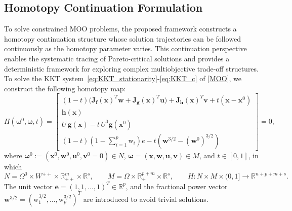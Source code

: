 \documentclass[11pt,pdflatex,sn-mathphys-ay]{sn-jnl}%
\theoremstyle{definition}
\theoremstyle{thmstyleone}%
\theoremstyle{thmstyletwo}%
\theoremstyle{thmstylethree}%
\newcommand{\bb}[1]{\mathbf{#1}}
\begin{document}
	\subsection{Homotopy Continuation Formulation}
	To solve constrained MOO problems, the proposed framework constructs a homotopy continuation structure whose solution trajectories can be followed continuously as the homotopy parameter varies. This continuation perspective enables the systematic tracing of Pareto-critical solutions and provides a deterministic framework for exploring complex multiobjective trade-off structures.
	To solve the KKT system~\eqref{eq:KKT_stationarity}-\eqref{eq:KKT_c} of \eqref{MOO}, 
	we construct the following homotopy map:
	\begin{equation} \label{homotopy} 
		H(\bm{\omega}^0, \bm{\omega}, t) =
		\begin{bmatrix}
			(1-t)\big(\bb{J}_{\bm{f}}(\bm{x})^T \bb{w} 
			+ \bb{J}_{\bm{g}}(\bm{x})^T \bm{u}\big)
			+ \bb{J}_{\bm{h}}(\bm{x})^T \bm{v}
			+ t(\bm{x}-\bm{x}^0) \\[2pt]
			\bm{h}(\bm{x}) \\[2pt]
			U\, \bm{g}(\bm{x}) - t\,U^0 \bm{g}(\bm{x}^0) \\[2pt]
			(1-t)\!\left(1-\sum\limits_{i=1}^p \text{w}_i\right)e 
			- t\!\left(\bb{w}^{3/2} - (\bb{w}^0)^{3/2}\right)
		\end{bmatrix}
		= 0,
	\end{equation}
	\noindent
	where $\bm{\omega}^0 := (\bm{x}^0, \bb{w}^0, \bm{u}^0, \bm{v}^0=0) \in N$, $\bm{\omega} = (\bm{x}, \bb{w}, \bm{u}, \bm{v}) \in M$,  and $t \in [0,1]$, in which 
	\[
	N = \Omega^0 \times W^{++} \times \mathbb{R}^m_{++} \times \mathbb{R}^s, 
	\qquad 
	M = \Omega \times \mathbb{R}^{p+m}_{+} \times \mathbb{R}^s,
	\qquad
	H: N \times M \times (0,1] \to \mathbb{R}^{n+p+m+s}.
	\]
	\noindent 
	The unit vector $\bm{e} = (1, 1, \dots, 1)^T \in \mathbb{R}^p$, 
	and the fractional power vector $\bb{w}^{3/2} = (\text{w}_1^{3/2}, \dots, \text{w}_p^{3/2})^T$  are introduced to avoid trivial solutions.  
\end{document}
